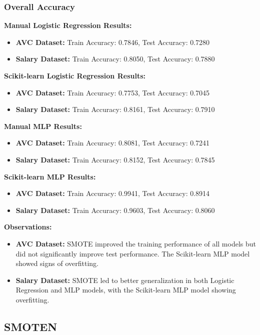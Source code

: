 \documentclass[a4paper,12pt]{article}
\begin{document}
\subsubsection{Overall Accuracy}

\textbf{Manual Logistic Regression Results:}
\begin{itemize}
    \item \textbf{AVC Dataset:} Train Accuracy: 0.7846, Test Accuracy: 0.7280
    \item \textbf{Salary Dataset:} Train Accuracy: 0.8050, Test Accuracy: 0.7880
\end{itemize}

\textbf{Scikit-learn Logistic Regression Results:}
\begin{itemize}
    \item \textbf{AVC Dataset:} Train Accuracy: 0.7753, Test Accuracy: 0.7045
    \item \textbf{Salary Dataset:} Train Accuracy: 0.8161, Test Accuracy: 0.7910
\end{itemize}

\textbf{Manual MLP Results:}
\begin{itemize}
    \item \textbf{AVC Dataset:} Train Accuracy: 0.8081, Test Accuracy: 0.7241
    \item \textbf{Salary Dataset:} Train Accuracy: 0.8152, Test Accuracy: 0.7845
\end{itemize}

\textbf{Scikit-learn MLP Results:}
\begin{itemize}
    \item \textbf{AVC Dataset:} Train Accuracy: 0.9941, Test Accuracy: 0.8914
    \item \textbf{Salary Dataset:} Train Accuracy: 0.9603, Test Accuracy: 0.8060
\end{itemize}

\textbf{Observations:}
\begin{itemize}
    \item \textbf{AVC Dataset:} SMOTE improved the training performance of all models but did not significantly improve test performance. The Scikit-learn MLP model showed signs of overfitting.
    \item \textbf{Salary Dataset:} SMOTE led to better generalization in both Logistic Regression and MLP models, with the Scikit-learn MLP model showing overfitting.
\end{itemize}

\subsection{SMOTEN}
\end{document}
